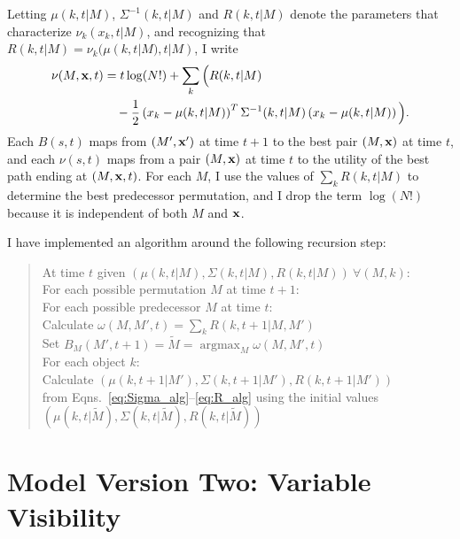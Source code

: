 \documentclass[12pt]{article}
\newcommand{\argmax}{\operatorname*{argmax}}
\begin{document}
Letting $\mu(k,t|M)$, $\Sigma^{-1}(k,t|M)$ and $R(k,t|M)$ denote the
parameters that characterize $\nu_k(x_k,t|M)$, and recognizing that
$R(k,t|M) = \nu_k(\mu(k,t|M),t|M)$, I write
\begin{align*}
  \nu(M,{\mathbf{x}},t) &= t\log(N!) + \sum_k \Big( R(k,t|M) \\
  &\quad - \frac{1}{2} \left( x_k-\mu(k,t|M) \right)^T
  \Sigma^{-1}(k,t|M) \left( x_k-\mu(k,t|M) \right) \Big).
\end{align*}
Each $B(s,t)$ maps from $(M',{\mathbf{x}}')$ at time $t+1$ to the best pair
$(M,{\mathbf{x}})$ at time $t$, and each $\nu(s,t)$ maps from a pair $(M,{\mathbf{x}})$
at time $t$ to the utility of the best path ending at $(M,{\mathbf{x}},t)$.
For each $M$, I use the values of $\sum_k R(k,t|M)$ to determine the
best predecessor permutation, and I drop the term $\log(N!)$ because
it is independent of both $M$ and ${\mathbf{x}}$.

I have implemented an algorithm around the following recursion step:
\begin{verse}
  At time $t$ given $(\mu(k,t|M), \Sigma(k,t|M), R(k,t|M))~\forall
  (M,k)$:\\
  For each possible permutation $M$ at time $t+1$:\\
  \hspace{2em} For each possible predecessor $M$ at time $t$:\\
  \hspace{4em} Calculate $\omega(M,M',t) = \sum_k R(k,t+1|M,M')$ \\
  \hspace{2em} Set $B_M(M',t+1) = \tilde M = \argmax_{M}\omega(M,M',t)$\\
  \hspace{2em} For each object $k$:\\
  \hspace{4em} Calculate $(\mu(k,t+1|M'), \Sigma(k,t+1|M'), R(k,t+1|M'))$\\
  \hspace{4em} from Eqns.~\eqref{eq:Sigma_alg}--\eqref{eq:R_alg} using
  the initial values\\
  \hspace{4em} $(\mu(k,t|\tilde M), \Sigma(k,t|\tilde M),R(k,t|\tilde
  M))$
\end{verse}

\section{Model Version Two: Variable Visibility}
\label{sec:model2}
\end{document}
